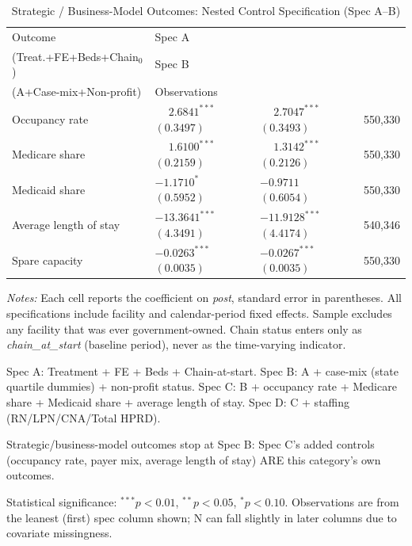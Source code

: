 \begin{table}[H]
\centering
\begin{threeparttable}
\caption{Strategic / Business-Model Outcomes: Nested Control Specification (Spec A--B)}
\label{tab:nested-strategic}
\small
\setlength{\tabcolsep}{6pt}
\begin{tabularx}{\textwidth}{@{} l Y Y r @{}}
\toprule
Outcome & Spec A\\(Treat.+FE+Beds+Chain$_{0}$) & Spec B\\(A+Case-mix+Non-profit) & Observations \\
\midrule
Occupancy rate &  &  & 550,330 \\
Medicare share &  &  & 550,330 \\
Medicaid share &  &  & 550,330 \\
Average length of stay &  &  & 540,346 \\
Spare capacity &  &  & 550,330 \\
\bottomrule
\end{tabularx}

\begin{tablenotes}[flushleft]
\footnotesize
\item \textit{Notes:} Each cell reports the coefficient on \textit{post}, standard error in parentheses. All specifications include facility and calendar-period fixed effects. Sample excludes any facility that was ever government-owned. Chain status enters only as \textit{chain\_at\_start} (baseline period), never as the time-varying indicator.
\item Spec A: Treatment + FE + Beds + Chain-at-start. Spec B: A + case-mix (state quartile dummies) + non-profit status. Spec C: B + occupancy rate + Medicare share + Medicaid share + average length of stay. Spec D: C + staffing (RN/LPN/CNA/Total HPRD).
\item Strategic/business-model outcomes stop at Spec B: Spec C's added controls (occupancy rate, payer mix, average length of stay) ARE this category's own outcomes.
\item Statistical significance: $^{***}p<0.01$, $^{**}p<0.05$, $^{*}p<0.10$. Observations are from the leanest (first) spec column shown; N can fall slightly in later columns due to covariate missingness.
\end{tablenotes}
\end{threeparttable}
\end{table}

